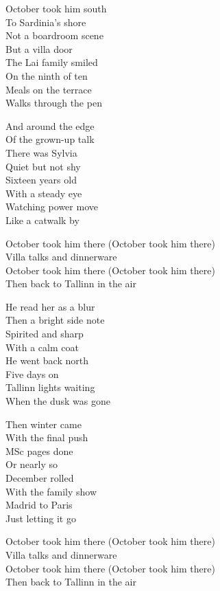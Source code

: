 \begin{lyrics}
October took him south\\
To Sardinia's shore\\
Not a boardroom scene\\
But a villa door\\
The Lai family smiled\\
On the ninth of ten\\
Meals on the terrace\\
Walks through the pen

And around the edge\\
Of the grown-up talk\\
There was Sylvia\\
Quiet but not shy\\
Sixteen years old\\
With a steady eye\\
Watching power move\\
Like a catwalk by

October took him there (October took him there)\\
Villa talks and dinnerware\\
October took him there (October took him there)\\
Then back to Tallinn in the air

He read her as a blur\\
Then a bright side note\\
Spirited and sharp\\
With a calm coat\\
He went back north\\
Five days on\\
Tallinn lights waiting\\
When the dusk was gone

Then winter came\\
With the final push\\
MSc pages done\\
Or nearly so\\
December rolled\\
With the family show\\
Madrid to Paris\\
Just letting it go

October took him there (October took him there)\\
Villa talks and dinnerware\\
October took him there (October took him there)\\
Then back to Tallinn in the air


\end{lyrics}
